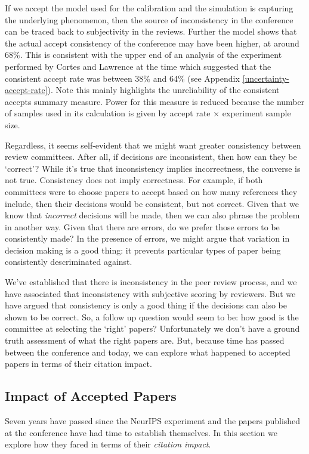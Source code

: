 \documentclass[twoside]{article}
\begin{document}
If we accept the model used for the calibration and the simulation is capturing the underlying phenomenon, then the source of inconsistency in the conference can be traced back to subjectivity in the reviews. Further the model shows that the actual accept consistency of the conference may have been higher, at around 68\%. This is consistent with the upper end of an analysis of the experiment performed by Cortes and Lawrence at the time which suggested that the consistent accept rate was between 38\% and 64\% (see Appendix \ref{uncertainty-accept-rate}). Note this mainly highlights the unreliability of the consistent accepts summary measure. Power for this measure is reduced because the number of samples used in its calculation is given by accept rate $\times$ experiment sample size.

Regardless, it seems self-evident that we might want greater consistency between review committees. After all, if decisions are inconsistent, then how can they be `correct'? While it's true that inconsistency implies incorrectness, the converse is not true. Consistency does not imply correctness. For example, if both committees were to choose papers to accept based on how many references they include, then their decisions would be consistent, but not correct. Given that we know that \emph{incorrect} decisions will be made, then we can also phrase the problem in another way. Given that there are errors, do we prefer those errors to be consistently made? In the presence of errors, we might argue that variation in decision making is a good thing: it prevents particular types of paper being consistently descriminated against.

We've established that there is inconsistency in the peer review process, and we have associated that inconsistency with subjective scoring by reviewers. But we have argued that consistency is only a good thing if the decisions can also be shown to be correct. So, a follow up question would seem to be: how good is the committee at selecting the `right' papers? Unfortunately we don't have a ground truth assessment of what the right papers are. But, because time has passed between the conference and today, we can explore what happened to accepted papers in terms of their citation impact. 

\subsection{Impact of Accepted Papers}

Seven years have passed since the NeurIPS experiment and the papers published at the conference have had time to establish themselves. In this section we explore how they fared in terms of their \emph{citation impact}.
\end{document}
